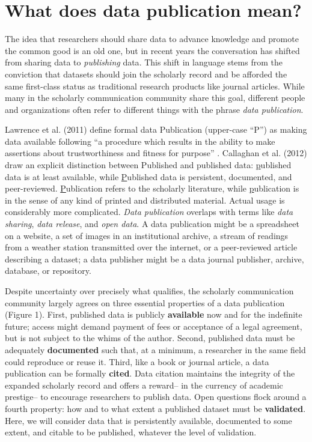 \documentclass[10pt,a4paper,twocolumn]{article}
\begin{document}
\section*{What does data publication mean?}\label{introduction}

The idea that researchers should share data to advance knowledge and promote the common good is an old one, but in recent years the conversation has shifted from sharing data to \emph{publishing} data\cite{costello_motivating_2009,smith_data_2009,lawrence_citation_2011}.
This shift in language stems from the conviction that datasets should join the scholarly record and be afforded the same first-class status as traditional research products like journal articles\cite{reilly_report_2011, callaghan_making_2012}.
While many in the scholarly communication community share this goal, different people and organizations often refer to different things with the phrase \emph{data publication}.

Lawrence et al. (2011) define formal data Publication (upper-case ``P'') as making data available following ``a procedure which results in the ability to make assertions about trustworthiness and fitness for purpose'' \cite{lawrence_data_2011}.
Callaghan et al. (2012) draw an explicit distinction between Published and published data: \underline{p}ublished data is at least available, while \underline{P}ublished data is persistent, documented, and peer-reviewed\cite{callaghan_making_2012}.
\underline{P}ublication refers to the scholarly literature, while \underline{p}ublication is in the sense of any kind of printed and distributed material.
Actual usage is considerably more complicated.
\emph{Data publication} overlaps with terms like \emph{data sharing}, \emph{data release}, and \emph{open data}.
A data publication might be a spreadsheet on a website, a set of images in an institutional archive, a stream of readings from a weather station transmitted over the internet, or a peer-reviewed article describing a dataset; a data publisher might be a data journal publisher, archive, database, or repository.

Despite uncertainty over precisely what qualifies, the scholarly communication community largely agrees on three essential properties of a data publication (Figure 1)\cite{smith_data_2009,callaghan_making_2012}.
First, published data is publicly \textbf{available} now and for the indefinite future; access might demand payment of fees or acceptance of a legal agreement, but is not subject to the whims of the author.
Second, published data must be adequately \textbf{documented} such that, at a minimum, a researcher in the same field could reproduce or reuse it.
Third, like a book or journal article, a data publication can be formally \textbf{cited}.
Data citation maintains the integrity of the expanded scholarly record and offers a reward-- in the currency of academic prestige-- to encourage researchers to publish data. 
Open questions flock around a fourth property: how and to what extent a published dataset must be \textbf{validated}.
Here, we will consider data that is persistently available, documented to some extent, and citable to be published, whatever the level of validation. 
\end{document}
